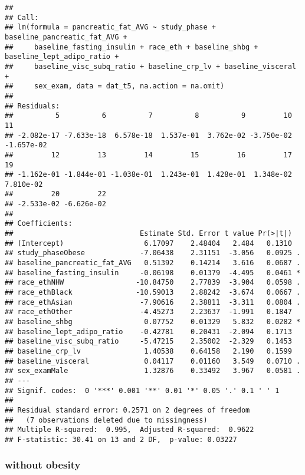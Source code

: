 \documentclass[
]{article}
\begin{document}
\begin{verbatim}
## 
## Call:
## lm(formula = pancreatic_fat_AVG ~ study_phase + baseline_pancreatic_fat_AVG + 
##     baseline_fasting_insulin + race_eth + baseline_shbg + baseline_lept_adipo_ratio + 
##     baseline_visc_subq_ratio + baseline_crp_lv + baseline_visceral + 
##     sex_exam, data = dat_t5, na.action = na.omit)
## 
## Residuals:
##          5          6          7          8          9         10         11 
## -2.082e-17 -7.633e-18  6.578e-18  1.537e-01  3.762e-02 -3.750e-02 -1.657e-02 
##         12         13         14         15         16         17         19 
## -1.162e-01 -1.844e-01 -1.038e-01  1.243e-01  1.428e-01  1.348e-02  7.810e-02 
##         20         22 
## -2.533e-02 -6.626e-02 
## 
## Coefficients:
##                              Estimate Std. Error t value Pr(>|t|)  
## (Intercept)                   6.17097    2.48404   2.484   0.1310  
## study_phaseObese             -7.06438    2.31151  -3.056   0.0925 .
## baseline_pancreatic_fat_AVG   0.51392    0.14214   3.616   0.0687 .
## baseline_fasting_insulin     -0.06198    0.01379  -4.495   0.0461 *
## race_ethNHW                 -10.84750    2.77839  -3.904   0.0598 .
## race_ethBlack               -10.59013    2.88242  -3.674   0.0667 .
## race_ethAsian                -7.90616    2.38811  -3.311   0.0804 .
## race_ethOther                -4.45273    2.23637  -1.991   0.1847  
## baseline_shbg                 0.07752    0.01329   5.832   0.0282 *
## baseline_lept_adipo_ratio    -0.42781    0.20431  -2.094   0.1713  
## baseline_visc_subq_ratio     -5.47215    2.35002  -2.329   0.1453  
## baseline_crp_lv               1.40538    0.64158   2.190   0.1599  
## baseline_visceral             0.04117    0.01160   3.549   0.0710 .
## sex_examMale                  1.32876    0.33492   3.967   0.0581 .
## ---
## Signif. codes:  0 '***' 0.001 '**' 0.01 '*' 0.05 '.' 0.1 ' ' 1
## 
## Residual standard error: 0.2571 on 2 degrees of freedom
##   (7 observations deleted due to missingness)
## Multiple R-squared:  0.995,  Adjusted R-squared:  0.9622 
## F-statistic: 30.41 on 13 and 2 DF,  p-value: 0.03227
\end{verbatim}

\hypertarget{without-obesity-2}{%
\subsubsection{without obesity}\label{without-obesity-2}}
\end{document}
